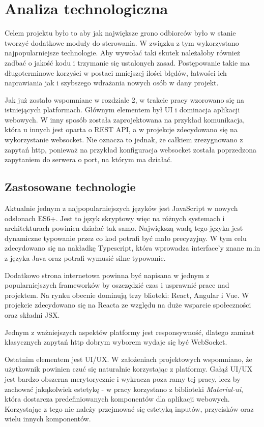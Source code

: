 \chapter{Analiza technologiczna}
Celem projektu było to aby jak największe grono odbiorców było w stanie tworzyć dodatkowe moduły do sterowania. W związku z tym wykorzystano najpopularniejsze technologie. Aby wywołać taki skutek należałoby również zadbać o jakość kodu i trzymanie się ustalonych zasad. Postępowanie takie ma długoterminowe korzyści w postaci mniejszej ilości błędów, łatwości ich naprawiania jak i szybszego wdrażania nowych osób w dany projekt. 
\par Jak już zostało wspomniane w rozdziale 2, w trakcie pracy wzorowano się na istniejących platformach. Głównym elementem był UI i dominacja aplikacji webowych. W inny sposób została zaprojektowana na przykład komunikacja, która u innych jest oparta o REST API, a w projekcje zdecydowano się na wykorzystanie websocket. Nie oznacza to jednak, że całkiem zrezygnowano z zapytań http, ponieważ na przykład konfiguracja websocket została poprzedzona zapytaniem do serwera o port, na którym ma działać. \cite{websocket, express}
\section{Zastosowane technologie}
Aktualnie jednym z najpopularniejszych języków jest JavaScript w nowych odsłonach ES6+. Jest to język skryptowy więc na różnych systemach i architekturach powinien działać tak samo. Największą wadą tego języka jest dynamiczne typowanie przez co kod potrafi być mało precyzyjny. W tym celu zdecydowano się na nakładkę Typescript, która wprowadza interface'y znane m.in z języka Java  oraz potrafi wymusić silne typowanie.\cite{javascript} \par Dodatkowo strona internetowa powinna być napisana w jednym z popularniejszych frameworków by oszczędzić czas i usprawnić prace nad projektem. Na rynku obecnie dominują trzy blioteki: React, Angular i Vue. W projekcie zdecydowano się na Reacta ze względu na duże wsparcie społeczności oraz składni JSX.  \cite{React} \par
Jednym z ważniejszych aspektów platformy jest responsywność, dlatego zamiast klasycznych zapytań http dobrym wyborem wydaje się być WebSocket. \cite{websocket}
\par Ostatnim elementem jest UI/UX. W założeniach projektowych wspomniano, że użytkownik powinien czuć się naturalnie korzystając z platformy. Gałąź UI/UX jest bardzo obszerna merytorycznie i wykracza poza ramy tej pracy, lecz by zachować jakąkolwiek estetykę - w pracy korzystano z biblioteki \textit{Material-ui}, która dostarcza predefiniowanych komponentów dla aplikacji webowych. Korzystając z tego nie należy przejmować się estetyką inputów, przycisków oraz wielu innych komponentów. \cite{materialui}
